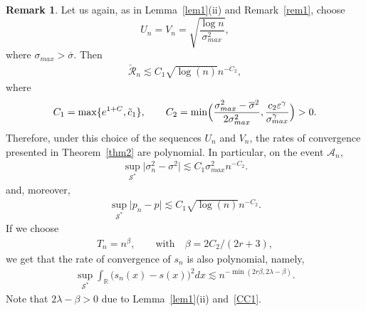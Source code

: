 \documentclass[a4paper,11pt]{article}
\theoremstyle{definition}
\newtheorem{remark}{Remark}
\newcommand{\R}{{\mathbb{R}}}
\newcommand{\1}{\mathbb{I}}
\newcommand{\A}{\mathscr{A}}
\renewcommand{\A}{\mathcal{A}}
\def\R{\mathbb{R}}
\newcommand{\eps}{\varepsilon}
\theoremstyle{remark}
\begin{document}
\begin{remark}\label{remark2}
    Let us again, as in Lemma~\ref{lem1}(ii) and Remark~\ref{rem1}, choose
 $$U_n = V_n = \sqrt{\frac{\log n}{\sigma^2_{max}}}, 
$$ where $\sigma_{max} > \overline{\sigma}$. Then 
    \begin{eqnarray*}
\breve{\mathcal{R}}_n \lesssim C_1 \sqrt{\log(n)} n^{-C_2},
\end{eqnarray*}
where 
  \begin{eqnarray}
\label{CC1}
C_1 = \max\{e^{1+C}, \tilde{c}_1\}, \qquad C_2 = \min \Bigl(\frac{\sigma^2_{max} - \overline{\sigma}^2}{2\sigma^2_{max}}, \frac{ c_2\eps^{\gamma}}{\sigma^{\gamma}_{max}} \Bigr) > 0.\end{eqnarray}
Therefore, under this choice of the sequences \(U_n\)    and \(V_n\), the rates of convergence presented in Theorem~\ref{thm2} are polynomial. In particular, on the event \(\A_n\), 
\begin{eqnarray*}
\sup_{\mathcal{S}^*}
\bigl|\sigma^2_n - \sigma^2
\bigr| \lesssim  C_1\sigma_{max}^2  n^{-C_2}.
\end{eqnarray*}
and, moreover, 
\begin{align*}
\sup_{\mathcal{S}^*}
\bigl|p_n - p
\bigr| \lesssim C_1 \sqrt{\log(n)} n^{-C_2}. %
\end{align*}
If we choose 
\begin{eqnarray*}
T_n = n^{\beta}, \qquad \mbox{with} \quad \beta=2C_2/(2r+3),
\end{eqnarray*}
we get that the rate of convergence of \(s_n\) is also polynomial, namely, 
\begin{eqnarray*}
\sup_{\mathcal{S}^*} \int_{\R} \bigl( 
s_n(x) - s(x) 
\bigr)^2 dx \lesssim 
n^{-\min(2r\beta, 2\lambda-\beta)}.
\end{eqnarray*}
Note that \(2\lambda-\beta>0\) due to Lemma~\ref{lem1}(ii) and~\eqref{CC1}.
\end{remark}
\end{document}
